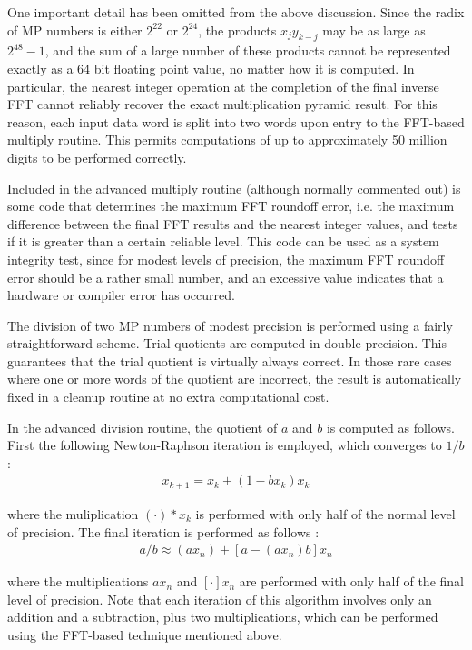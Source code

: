 One important detail has been omitted from the above discussion.
Since the radix of MP numbers is either $2^{22}$ or $2^{24}$, the
products $x_j y_{k-j}$ may be as large as $2^{48} - 1$, and the sum of
a large number of these products cannot be represented exactly as a 64
bit floating point value, no matter how it is computed.  In
particular, the nearest integer operation at the completion of the
final inverse FFT cannot reliably recover the exact multiplication
pyramid result.  For this reason, each input data word is split into
two words upon entry to the FFT-based multiply routine.  This permits
computations of up to approximately 50 million digits to be performed
correctly.

Included in the advanced multiply routine (although normally commented
out) is some code that determines the maximum FFT roundoff error, i.e.
the maximum difference between the final FFT results and the nearest
integer values, and tests if it is greater than a certain reliable
level.  This code can be used as a system integrity test, since for
modest levels of precision, the maximum FFT roundoff error should be a
rather small number, and an excessive value indicates that a hardware
or compiler error has occurred.

The division of two MP numbers of modest precision is performed using
a fairly straightforward scheme.  Trial quotients are computed in
double precision.  This guarantees that the trial quotient is
virtually always correct.  In those rare cases where one or more words
of the quotient are incorrect, the result is automatically fixed in a
cleanup routine at no extra computational cost.

In the advanced division routine, the quotient of $a$ and $b$ is
computed as follows.  First the following Newton-Raphson iteration is
employed, which converges to $1 / b$:
\begin{eqnarray*}
x_{k+1} = x_k + (1 - b x_k)x_k
\end{eqnarray*}

\noindent
where the muliplication $(\cdot) * x_k$ is performed with only half of
the normal level of precision.  The final iteration is performed as
follows \cite{karp}:
\begin{eqnarray*}
a / b \approx (a x_n) + [a - (a x_n) b] x_n
\end{eqnarray*}

\noindent
where the multiplications $a x_n$ and $[\cdot] x_n$ are performed with
only half of the final level of precision.  Note that each iteration
of this algorithm involves only an addition and a subtraction, plus
two multiplications, which can be performed using the FFT-based
technique mentioned above.

